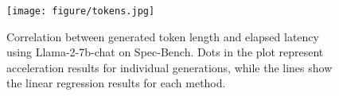 \begin{figure}[t]
\centering
\texttt{[image: figure/tokens.jpg]}
\vspace{-.8em}
\caption{\small Correlation between generated token length and elapsed latency using Llama-2-7b-chat on Spec-Bench. Dots in the plot represent acceleration results for individual generations, while the lines show the linear regression results for each method.}
\label{fig:tokens}
\vspace{-.5em}
\end{figure}